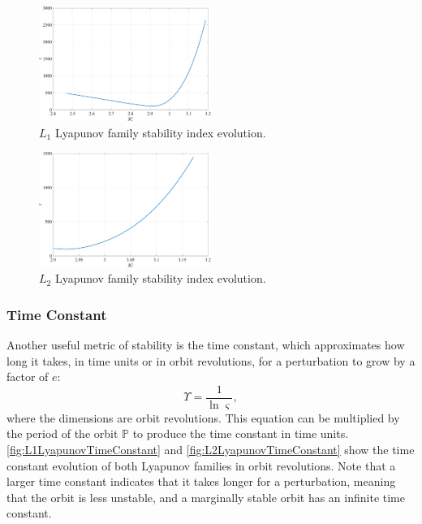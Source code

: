 \begin{figure}[ht]
    \centering
    \includegraphics[width=0.5\textwidth]{figures/L1LyapunovStability.pdf}
    \caption{$L_{1}$ Lyapunov family stability index evolution.}
    \label{fig:L1LyapunovStability}
\end{figure}

\begin{figure}[ht]
    \centering
    \includegraphics[width=0.5\textwidth]{figures/L2LyapunovStability.pdf}
    \caption{$L_{2}$ Lyapunov family stability index evolution.}
    \label{fig:L2LyapunovStability}
\end{figure}

\subsubsection{Time Constant}
Another useful metric of stability is the time constant, which approximates how long it takes, in
time units or in orbit revolutions, for a perturbation to grow by a factor of $e$:
\begin{equation}
    \Upsilon=\frac{1}{\ln\varsigma},
    \label{eq:timeconstant}
\end{equation}
where the dimensions are orbit revolutions. This equation can be multiplied by the period of the
orbit $\mathbb{P}$ to produce the time constant in time units. \cref{fig:L1LyapunovTimeConstant}
and \cref{fig:L2LyapunovTimeConstant} show the time constant evolution of both Lyapunov families in
orbit revolutions. Note that a larger time constant indicates that it takes longer for a
perturbation, meaning that the orbit is less unstable, and a marginally stable orbit has an
infinite time constant.

